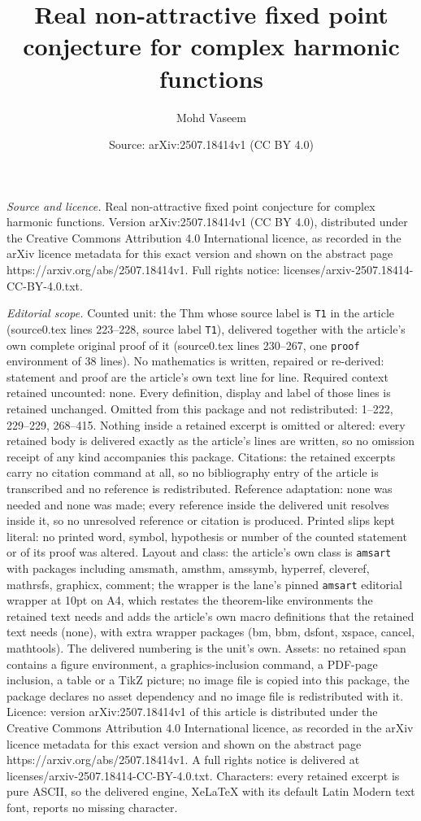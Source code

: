 \documentclass[10pt,a4paper]{amsart}
\title[Real non-attractive fixed point conjecture for complex harmo]{Real non-attractive fixed point conjecture for complex harmonic functions}
\author{Mohd Vaseem}
\date{Source: arXiv:2507.18414v1 (CC BY 4.0)}
\begin{document}
\maketitle

\noindent\emph{Source and licence.} Real non-attractive fixed point conjecture for complex harmonic functions. Version arXiv:2507.18414v1 (CC BY 4.0), distributed under the Creative Commons Attribution 4.0 International licence, as recorded in the arXiv licence metadata for this exact version and shown on the abstract page https://arxiv.org/abs/2507.18414v1. Full rights notice: licenses/arxiv-2507.18414-CC-BY-4.0.txt.\par\smallskip

\noindent\textit{Editorial scope.} Counted unit: the Thm whose source label is \texttt{T1} in the article (source0.tex lines 223--228, source label \texttt{T1}), delivered together with the article's own complete original proof of it (source0.tex lines 230--267, one \texttt{proof} environment of 38 lines). No mathematics is written, repaired or re-derived: statement and proof are the article's own text line for line. Required context retained uncounted: none. Every definition, display and label of those lines is retained unchanged. Omitted from this package and not redistributed: 1--222, 229--229, 268--415. Nothing inside a retained excerpt is omitted or altered: every retained body is delivered exactly as the article's lines are written, so no omission receipt of any kind accompanies this package. Citations: the retained excerpts carry no citation command at all, so no bibliography entry of the article is transcribed and no reference is redistributed. Reference adaptation: none was needed and none was made; every reference inside the delivered unit resolves inside it, so no unresolved reference or citation is produced. Printed slips kept literal: no printed word, symbol, hypothesis or number of the counted statement or of its proof was altered. Layout and class: the article's own class is \texttt{amsart} with packages including amsmath, amsthm, amssymb, hyperref, cleveref, mathrsfs, graphicx, comment; the wrapper is the lane's pinned \texttt{amsart} editorial wrapper at 10pt on A4, which restates the theorem-like environments the retained text needs and adds the article's own macro definitions that the retained text needs (none), with extra wrapper packages (bm, bbm, dsfont, xspace, cancel, mathtools). The delivered numbering is the unit's own. Assets: no retained span contains a figure environment, a graphics-inclusion command, a PDF-page inclusion, a table or a TikZ picture; no image file is copied into this package, the package declares no asset dependency and no image file is redistributed with it. Licence: version arXiv:2507.18414v1 of this article is distributed under the Creative Commons Attribution 4.0 International licence, as recorded in the arXiv licence metadata for this exact version and shown on the abstract page https://arxiv.org/abs/2507.18414v1. A full rights notice is delivered at licenses/arxiv-2507.18414-CC-BY-4.0.txt. Characters: every retained excerpt is pure ASCII, so the delivered engine, XeLaTeX with its default Latin Modern text font, reports no missing character.
\end{document}
